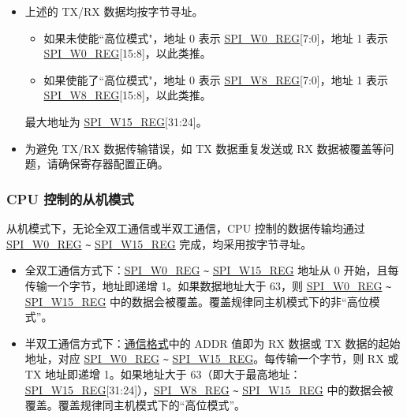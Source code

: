 \documentclass[main\_\_CN.tex]{subfiles}
\begin{document}
\begin{tiplisting}
\vspace{-2em}
\begin{itemize}
    \item 上述的 TX/RX 数据均按字节寻址。
    \begin{itemize}
        \item 如果未使能``高位模式"，地址 0 表示 \hyperref[regdesc:SPIW0REG]{SPI\_W0\_REG}[7:0]，地址 1 表示 \hyperref[regdesc:SPIW0REG]{SPI\_W0\_REG}[15:8]，以此类推。
        \item 如果使能了``高位模式"，地址 0 表示 \hyperref[regdesc:SPIW8REG]{SPI\_W8\_REG}[7:0]，地址 1 表示 \hyperref[regdesc:SPIW8REG]{SPI\_W8\_REG}[15:8]，以此类推。
    \end{itemize}
    最大地址为 \hyperref[regdesc:SPIW15REG]{SPI\_W15\_REG}[31:24]。
    \item 为避免 TX/RX 数据传输错误，如 TX 数据重复发送或 RX 数据被覆盖等问题，请确保寄存器配置正确。
\end{itemize}
\end{tiplisting}


\subsubsection{CPU 控制的从机模式} \label{GP-SPI2 slave CPU}

从机模式下，无论全双工通信或半双工通信，CPU 控制的数据传输均通过 \hyperref[regdesc:SPIW0REG]{SPI\_W0\_REG} \verb+~+ \hyperref[regdesc:SPIW15REG]{SPI\_W15\_REG} 完成，均采用按字节寻址。

\begin{itemize}
    \item 全双工通信方式下：\hyperref[regdesc:SPIW0REG]{SPI\_W0\_REG} \verb+~+ \hyperref[regdesc:SPIW15REG]{SPI\_W15\_REG} 地址从 0 开始，且每传输一个字节，地址即递增 1。如果数据地址大于 63，则 \hyperref[regdesc:SPIW0REG]{SPI\_W0\_REG} \verb+~+ \hyperref[regdesc:SPIW15REG]{SPI\_W15\_REG} 中的数据会被覆盖。覆盖规律同主机模式下的非“高位模式”。
    \item 半双工通信方式下：\hyperref[slave communication format]{通信格式}中的 ADDR 值即为 RX 数据或 TX 数据的起始地址，对应 \hyperref[regdesc:SPIW0REG]{SPI\_W0\_REG} \verb+~+ \hyperref[regdesc:SPIW15REG]{SPI\_W15\_REG}。每传输一个字节，则 RX 或 TX 地址即递增 1。如果地址大于 63（即大于最高地址：\hyperref[regdesc:SPIW15REG]{SPI\_W15\_REG}[31:24]），\hyperref[regdesc:SPIW8REG]{SPI\_W8\_REG} \verb+~+ \hyperref[regdesc:SPIW15REG]{SPI\_W15\_REG} 中的数据会被覆盖。覆盖规律同主机模式下的“高位模式”。
\end{itemize}
\end{document}
